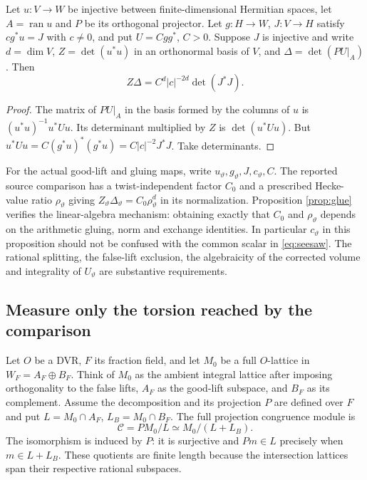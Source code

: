 \documentclass[11pt,a4paper]{article}
\begin{document}
\begin{proposition}\label{prop:glue}
Let $u:V\to W$ be injective between finite-dimensional Hermitian spaces, let $A=\operatorname{ran}u$ and $P$ be its orthogonal projector. Let $g:H\to W$, $J:V\to H$ satisfy $c g^*u=J$ with $c\ne0$, and put $U=Cgg^*$, $C>0$. Suppose $J$ is injective and write $d=\dim V$, $Z=\det(u^*u)$ in an orthonormal basis of $V$, and $\Delta=\det(PU|_A)$. Then
\begin{equation}\label{eq:glue}
Z\Delta=C^d|c|^{-2d}\det(J^*J).
\end{equation}
\end{proposition}
\begin{proof}
The matrix of $PU|_A$ in the basis formed by the columns of $u$ is $(u^*u)^{-1}u^*Uu$. Its determinant multiplied by $Z$ is $\det(u^*Uu)$. But $u^*Uu=C(g^*u)^*(g^*u)=C|c|^{-2}J^*J$. Take determinants.\end{proof}
For the actual good-lift and gluing maps, write $u_\vartheta,g_\vartheta,J,c_\vartheta,C$. The reported source comparison has a twist-independent factor $C_0$ and a prescribed Hecke-value ratio $\rho_\vartheta$ giving $Z_\vartheta\Delta_\vartheta=C_0\rho_\vartheta^d$ in its normalization. Proposition \ref{prop:glue} verifies the linear-algebra mechanism: obtaining exactly that $C_0$ and $\rho_\vartheta$ depends on the arithmetic gluing, norm and exchange identities. In particular $c_\vartheta$ in this proposition should not be confused with the common scalar in \eqref{eq:seesaw}. The rational splitting, the false-lift exclusion, the algebraicity of the corrected volume and integrality of $U_\vartheta$ are substantive requirements.

\subsection{Measure only the torsion reached by the comparison}
Let $O$ be a DVR, $F$ its fraction field, and let $M_0$ be a full $O$-lattice in $W_F=A_F\oplus B_F$. Think of $M_0$ as the ambient integral lattice after imposing orthogonality to the false lifts, $A_F$ as the good-lift subspace, and $B_F$ as its complement. Assume the decomposition and its projection $P$ are defined over $F$ and put $L=M_0\cap A_F$, $L_B=M_0\cap B_F$. The full projection congruence module is
\begin{equation}\label{eq:cong}
\mathcal C=PM_0/L\simeq M_0/(L+L_B).
\end{equation}
The isomorphism is induced by $P$: it is surjective and $Pm\in L$ precisely when $m\in L+L_B$. These quotients are finite length because the intersection lattices span their respective rational subspaces.
\end{document}
